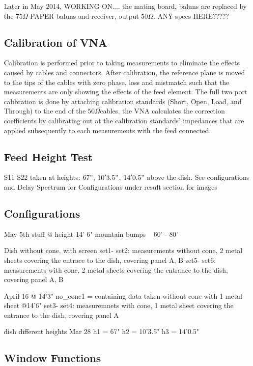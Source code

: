 \documentclass[preprint]{aastex}  %
\begin{document}
Later in May 2014, WORKING ON....
the mating board, baluns are replaced by the 75$\Omega$ PAPER baluns and receiver, output $50\Omega$. 
ANY specs HERE?????

\subsection{Calibration of VNA}
Calibration is performed prior to taking measurements to eliminate the effects caused by cables and connectors. After calibration, the reference plane is moved to the tips of the cables with zero phase, loss and mistmatch such that the measurements are only showing the effects of the feed element. The full two port calibration is done by attaching calibration standards (Short, Open, Load, and Through) to the end of the $50\Omega$cables, the VNA calculates the correction coefficients by calibrating out at the calibration standards' impedances that are applied subsequently to each measurements with the feed connected. 


\subsection{Feed Height Test}
S11 S22 taken at heights: $67"$, $10'3.5"$, $14'0.5"$ above the dish.
See configurations and Delay Spectrum for Configurations under result section for images


\subsection{Configurations}
May 5th stuff
@ height 14' 6"
mountain bumps ~ 60' - 80'

Dish without cone, with screen
set1- set2: measurements without cone, 2 metal sheets covering the entrace to the dish, covering panel A, B
set5- set6: measurements with cone, 2 metal sheets covering the entrance to the dish, covering panel A, B

April 16
@ 14'3" 
no_cone1 = containing data taken without cone with 1 metal sheet
@14'6"
set3- set4: measuremnets with cone, 1 metal sheet covering the entrance to the dish, covering panel A

dish different heights
Mar 28
h1 = 67"
h2 = 10'3.5"
h3 = 14'0.5"


\subsection{Window Functions}
\end{document}
